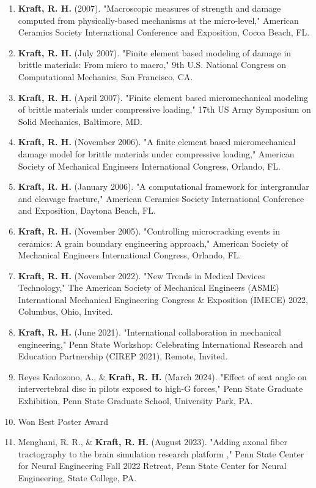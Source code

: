 \documentclass[a4paper,10pt]{article}
\begin{document}
\begin{enumerate}
  \item \textbf{\textbf{Kraft,} R. H.} (2007). "Macroscopic measures of strength and damage computed from physically-based mechanisms at the micro-level," American Ceramics Society International Conference and Exposition, Cocoa Beach, FL.
  \item \textbf{\textbf{Kraft,} R. H.} (July 2007). "Finite element based modeling of damage in brittle materials: From micro to macro," 9th U.S. National Congress on Computational Mechanics, San Francisco, CA.
  \item \textbf{\textbf{Kraft,} R. H.} (April 2007). "Finite element based micromechanical modeling of brittle materials under compressive loading," 17th US Army Symposium on Solid Mechanics, Baltimore, MD.
  \item \textbf{\textbf{Kraft,} R. H.} (November 2006). "A finite element based micromechanical damage model for brittle materials under compressive loading," American Society of Mechanical Engineers International Congress, Orlando, FL.
  \item \textbf{\textbf{Kraft,} R. H.} (January 2006). "A computational framework for intergranular and cleavage fracture," American Ceramics Society International Conference and Exposition, Daytona Beach, FL.
  \item \textbf{\textbf{Kraft,} R. H.} (November 2005). "Controlling microcracking events in ceramics: A grain boundary engineering approach," American Society of Mechanical Engineers International Congress, Orlando, FL.
  \item \textbf{\textbf{Kraft,} R. H.} (November 2022). "New Trends in Medical Devices Technology," The American Society of Mechanical Engineers (ASME) International Mechanical Engineering Congress \&
 Exposition (IMECE) 2022, Columbus, Ohio, Invited.
  \item \textbf{\textbf{Kraft,} R. H.} (June 2021). "International collaboration in mechanical engineering," Penn State Workshop: Celebrating International Research and Education Partnership (CIREP 2021), Remote, Invited.
  \item Reyes Kadozono, A., \&
 \textbf{\textbf{Kraft,} R. H.} (March 2024). "Effect of seat angle on intervertebral disc in pilots exposed to high-G forces," Penn State Graduate Exhibition, Penn State Graduate School, University Park, PA.
  \item Won Best Poster Award
  \item Menghani, R. R., \&
 \textbf{\textbf{Kraft,} R. H.} (August 2023). "Adding axonal fiber tractography to the brain simulation research platform ," Penn State Center for Neural Engineering Fall 2022 Retreat, Penn State Center for Neural Engineering, State College, PA.

\end{enumerate}
\end{document}
